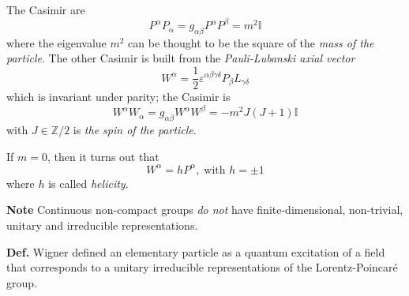 The Casimir are
\[
    P^\alpha P_\alpha = g_{\alpha\beta}P^\alpha P^\beta = m^2\mathbb{I}
\]
where the eigenvalue $m^2$ can be thought to be the square of the 
\textit{mass of the particle}.
The other Casimir is built from the \textit{Pauli-Lubanski axial vector}
\[
    W^\alpha = \frac{1}{2}\varepsilon^{\alpha\beta\gamma\delta}P_\beta
    L_{\gamma\delta}
\]
which is invariant under parity; the Casimir is
\[
    W^\alpha W_\alpha = g_{\alpha\beta}W^\alpha W^\beta = -m^2J(J+1)\mathbb{I}
\]
with $J\in\mathbb{Z}/2$ is \textit{the spin of the particle}.

If $m=0$, then it turns out that
\[
    W^\alpha=hP^\alpha,\;\text{with }h=\pm 1 
\]
where $h$ is called \textit{helicity}.

\textbf{Note} Continuous non-compact groups \textit{do not} have
finite-dimensional, non-trivial, unitary and irreducible representations.

\textbf{Def.} Wigner defined an elementary particle as a quantum excitation of a
field that corresponds to a unitary irreducible representations of the
Lorentz-Poincaré group.
